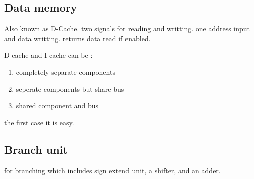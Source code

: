 \subsection{Data memory}
Also known as D-Cache. two signals for reading and writting. one address input and data writting. returns data read if enabled.

D-cache and I-cache can be :
\begin{enumerate}
    \item completely separate components
    \item seperate components but share bus
    \item shared component and bus
\end{enumerate}
the first case it is easy.

\subsection{Branch unit}
for branching which includes sign extend unit, a shifter, and an adder.